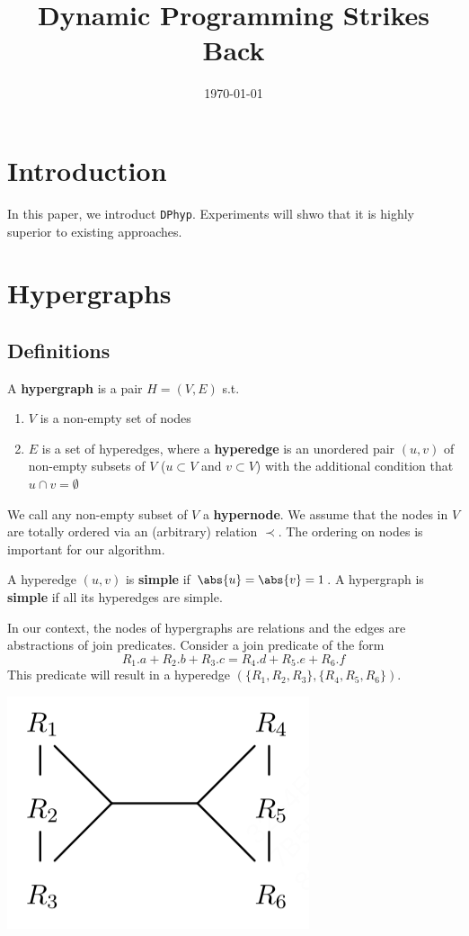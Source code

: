 \documentclass[11pt]{article}
\date{\today}
\title{Dynamic Programming Strikes Back}
\begin{document}
\maketitle
\section{Introduction}
\label{sec:org7a2460f}
In this paper, we introduct \texttt{DPhyp}. Experiments will shwo that it is highly superior to existing
approaches.
\section{Hypergraphs}
\label{sec:org450b895}
\subsection{Definitions}
\label{sec:orgefef46d}
\begin{definition}[Hypergraph]
A \textbf{hypergraph} is a pair \(H=(V,E)\) s.t.
\begin{enumerate}
\item \(V\) is a non-empty set of nodes
\item \(E\) is a set of hyperedges, where a \textbf{hyperedge} is an unordered pair \((u,v)\) of non-empty subsets
of \(V\) (\(u\subset V\) and \(v\subset V\)) with the additional condition that \(u\cap
           v=\emptyset\)
\end{enumerate}

We call any non-empty subset of \(V\) a \textbf{hypernode}. We assume that the nodes in \(V\) are totally
ordered via an (arbitrary) relation \(\prec\). The ordering on nodes is important for our algorithm.

A hyperedge \((u,v)\) is \textbf{simple} if \(\abs{u}=\abs{v}=1\). A hypergraph is \textbf{simple} if all its hyperedges
are simple.
\end{definition}

In our context, the nodes of hypergraphs are relations and the edges are abstractions of join
predicates. Consider a join predicate of the form
\begin{equation*}
R_1.a+R_2.b+R_3.c=R_4.d+R_5.e+R_6.f
\end{equation*}
This predicate will result in a hyperedge \((\{R_1,R_2,R_3\}, \{R_4,R_5,R_6\})\).


\begin{center}
\includegraphics[width=.5\textwidth]{../../images/papers/94.png}
\end{center}
\end{document}
